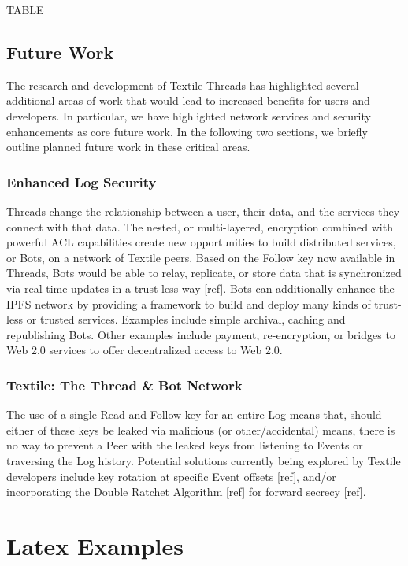 \documentclass{comjnl}
\begin{document}
TABLE

\subsection{Future Work}

The research and development of Textile Threads has highlighted several additional areas of work that would lead to increased benefits for users and developers. In particular, we have highlighted network services and security enhancements as core future work. In the following two sections, we briefly outline planned future work in these critical areas.

\subsubsection{Enhanced Log Security}

Threads change the relationship between a user, their data, and the services they connect with that data. The nested, or multi-layered, encryption combined with powerful ACL capabilities create new opportunities to build distributed services, or Bots, on a network of Textile peers. Based on the Follow key now available in Threads, Bots would be able to relay, replicate, or store data that is synchronized via real-time updates in a trust-less way [ref]. Bots can additionally enhance the IPFS network by providing a framework to build and deploy many kinds of trust-less or trusted services. Examples include simple archival, caching and republishing Bots. Other examples include payment, re-encryption, or bridges to Web 2.0 services to offer decentralized access to Web 2.0.

\subsubsection{Textile: The Thread \& Bot Network}

The use of a single Read and Follow key for an entire Log means that, should either of these keys be leaked via malicious (or other/accidental) means, there is no way to prevent a Peer with the leaked keys from listening to Events or traversing the Log history. Potential solutions currently being explored by Textile developers include key rotation at specific Event offsets [ref], and/or incorporating the Double Ratchet Algorithm [ref] for forward secrecy [ref].

\section{Latex Examples}
\end{document}
